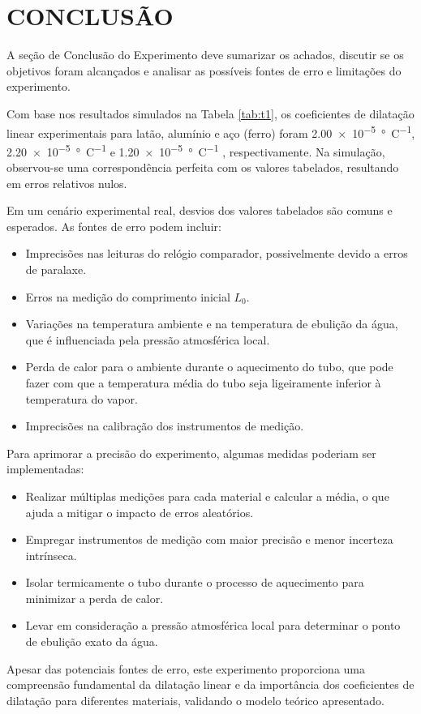 \section{CONCLUSÃO}

A seção de Conclusão do Experimento deve sumarizar os achados, discutir se os objetivos foram alcançados e analisar as possíveis fontes de erro e limitações do experimento.

Com base nos resultados simulados na Tabela \ref{tab:t1}, os coeficientes de dilatação linear experimentais para latão, alumínio e aço (ferro) foram \SI{2.00e-5}{\degree C^{-1}}, \SI{2.20e-5}{\degree C^{-1}} e \SI{1.20e-5}{\degree C^{-1}} , respectivamente. Na simulação, observou-se uma correspondência perfeita com os valores tabelados, resultando em erros relativos nulos.

Em um cenário experimental real, desvios dos valores tabelados são comuns e esperados. As fontes de erro podem incluir:
\begin{itemize}
    \item Imprecisões nas leituras do relógio comparador, possivelmente devido a erros de paralaxe.
    \item Erros na medição do comprimento inicial $L_0$.
    \item Variações na temperatura ambiente e na temperatura de ebulição da água, que é influenciada pela pressão atmosférica local.
    \item Perda de calor para o ambiente durante o aquecimento do tubo, que pode fazer com que a temperatura média do tubo seja ligeiramente inferior à temperatura do vapor.
    \item Imprecisões na calibração dos instrumentos de medição.
\end{itemize}
Para aprimorar a precisão do experimento, algumas medidas poderiam ser implementadas:
\begin{itemize}
    \item Realizar múltiplas medições para cada material e calcular a média, o que ajuda a mitigar o impacto de erros aleatórios.
    \item Empregar instrumentos de medição com maior precisão e menor incerteza intrínseca.
    \item Isolar termicamente o tubo durante o processo de aquecimento para minimizar a perda de calor.
    \item Levar em consideração a pressão atmosférica local para determinar o ponto de ebulição exato da água.
\end{itemize}
Apesar das potenciais fontes de erro, este experimento proporciona uma compreensão fundamental da dilatação linear e da importância dos coeficientes de dilatação para diferentes materiais, validando o modelo teórico apresentado.
